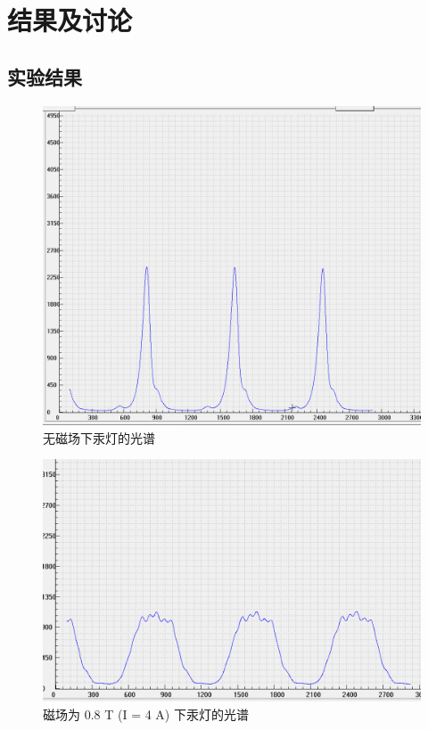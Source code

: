 \documentclass[font=default]{mpltx}
\begin{document}
\section{结果及讨论}

\subsection{实验结果}

\begin{figure}[htbp]
  \centering
  \includegraphics[width=0.85\linewidth]{fig/1.png}
  \caption{无磁场下汞灯的光谱}
  \label{fig:000}
\end{figure}

\begin{figure}[htbp]
  \centering
  \includegraphics[width=0.85\linewidth]{fig/5.png}
  \caption{磁场为 0.8 T (I = 4 A) 下汞灯的光谱}
  \label{fig:444}
\end{figure}
\end{document}
